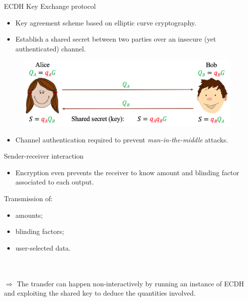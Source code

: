 \documentclass[usenames,dvipsnames]{beamer}
\newcommand{\backupend}{
	\addtocounter{framenumberappendix}{-\value{framenumber}}
	\addtocounter{framenumber}{\value{framenumberappendix}} 
}
\begin{document}
    \begin{frame}{ECDH Key Exchange protocol}
    \begin{itemize}
        \item Key agreement scheme based on elliptic curve cryptography.
        \item Establish a shared secret between two parties over an insecure (yet authenticated) channel.
    \end{itemize}
    \begin{center}
        \begin{figure}
            \includegraphics[scale = 0.5]{Images/ECDH.png}
        \end{figure}
    \end{center}
    \begin{itemize}
        \item Channel authentication required to prevent \textit{man-in-the-middle} attacks.
    \end{itemize}
    \end{frame}
    
    \begin{frame}{Sender-receiver interaction}
        \begin{itemize}
            \item Encryption even prevents the receiver to know amount and blinding factor associated to each output.
        \end{itemize}
        Transmission of:
        \begin{itemize}
            \item amounts;
            \item blinding factors;
            \item user-selected data.
        \end{itemize}\\ \ \\
        \centering$\Rightarrow$ The transfer can happen non-interactively by running an instance of ECDH and exploiting the shared key to deduce the quantities involved.
    \end{frame}
    
\backupend
\end{document}
